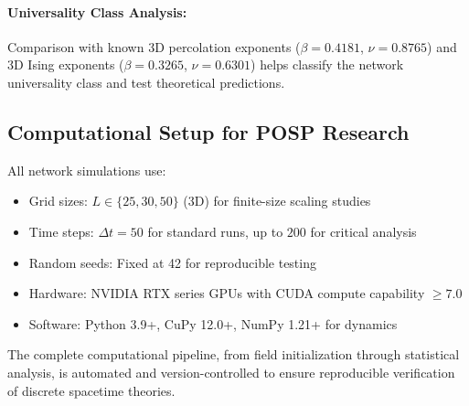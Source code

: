 \paragraph{Universality Class Analysis:}
Comparison with known 3D percolation exponents ($\beta = 0.4181$, $\nu = 0.8765$) 
and 3D Ising exponents ($\beta = 0.3265$, $\nu = 0.6301$) helps classify 
the \saturon{} network universality class and test \posp{} theoretical predictions.

\subsection{Computational Setup for POSP Research}

All \saturon{} network simulations use:
\begin{itemize}
\item Grid sizes: $L \in \{25, 30, 50\}$ (3D) for finite-size scaling studies
\item Time steps: $\Delta t = 50$ for standard runs, up to $200$ for critical analysis
\item Random seeds: Fixed at 42 for reproducible \posp{} testing
\item Hardware: NVIDIA RTX series GPUs with CUDA compute capability $\geq 7.0$
\item Software: Python 3.9+, CuPy 12.0+, NumPy 1.21+ for \saturon{} dynamics
\end{itemize}

The complete computational pipeline, from \saturon{} field initialization 
through \posp{} statistical analysis, is automated and version-controlled 
to ensure reproducible verification of discrete spacetime theories.

